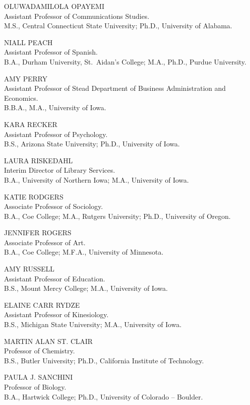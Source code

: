 \documentclass[
  letterpaper,
]{scrbook}
\begin{document}
OLUWADAMILOLA OPAYEMI\\
Assistant Professor of Communications Studies.\\
M.S., Central Connecticut State University; Ph.D., University of
Alabama.

NIALL PEACH\\
Assistant Professor of Spanish.\\
B.A., Durham University, St.~Aidan's College; M.A., Ph.D., Purdue
University.

AMY PERRY\\
Assistant Professor of Stead Department of Business Administration and
Economics.\\
B.B.A., M.A., University of Iowa.

KARA RECKER\\
Assistant Professor of Psychology.\\
B.S., Arizona State University; Ph.D., University of Iowa.

LAURA RISKEDAHL\\
Interim Director of Library Services.\\
B.A., University of Northern Iowa; M.A., University of Iowa.

KATIE RODGERS\\
Associate Professor of Sociology.\\
B.A., Coe College; M.A., Rutgers University; Ph.D., University of
Oregon.

JENNIFER ROGERS\\
Associate Professor of Art.\\
B.A., Coe College; M.F.A., University of Minnesota.

AMY RUSSELL\\
Assistant Professor of Education.\\
B.S., Mount Mercy College; M.A., University of Iowa.

ELAINE CARR RYDZE\\
Assistant Professor of Kinesiology.\\
B.S., Michigan State University; M.A., University of Iowa.

MARTIN ALAN ST. CLAIR\\
Professor of Chemistry.\\
B.S., Butler University; Ph.D., California Institute of Technology.

PAULA J. SANCHINI\\
Professor of Biology.\\
B.A., Hartwick College; Ph.D., University of Colorado -- Boulder.
\end{document}
